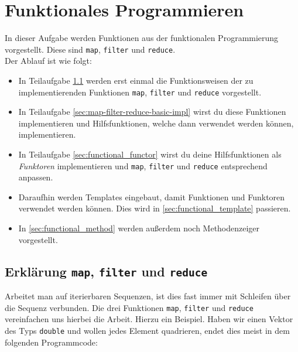 \section{\ExercisePrefixAdvanced Funktionales Programmieren \experimental}
\label{sec:functional}
\experimentaltextbox

In dieser Aufgabe werden Funktionen aus der funktionalen Programmierung vorgestellt.
Diese sind \lstinline{map}, \lstinline{filter} und \lstinline{reduce}. \\

Der Ablauf ist wie folgt:
\begin{itemize}
    \item In Teilaufgabe \ref{sec:map-filter-reduce-intro} werden erst einmal die Funktionsweisen der zu implementierenden Funktionen \lstinline{map}, \lstinline{filter} und \lstinline{reduce} vorgestellt.
	\item In Teilaufgabe \ref{sec:map-filter-reduce-basic-impl} wirst du diese Funktionen implementieren und Hilfsfunktionen, welche dann verwendet werden können, implementieren.
	\item In Teilaufgabe \ref{sec:functional_functor} wirst du deine Hilfsfunktionen als \emph{Funktoren} implementieren und \lstinline{map}, \lstinline{filter} und \lstinline{reduce} entsprechend anpassen.
	\item Daraufhin werden Templates eingebaut, damit Funktionen und Funktoren verwendet werden können. Dies wird in \ref{sec:functional_template} passieren.
	\item In \ref{sec:functional_method} werden außerdem noch Methodenzeiger vorgestellt.
\end{itemize}

\subsection{Erklärung \lstinline{map}, \lstinline{filter} und \lstinline{reduce}}\label{sec:map-filter-reduce-intro}

Arbeitet man auf iterierbaren Sequenzen, ist dies fast immer mit Schleifen über die Sequenz verbunden.
Die drei Funktionen \lstinline{map}, \lstinline{filter} und \lstinline{reduce} vereinfachen uns hierbei die Arbeit.
Hierzu ein Beispiel.
Haben wir einen Vektor des Typs \lstinline{double} und wollen jedes Element quadrieren, endet dies meist in dem folgenden Programmcode:


